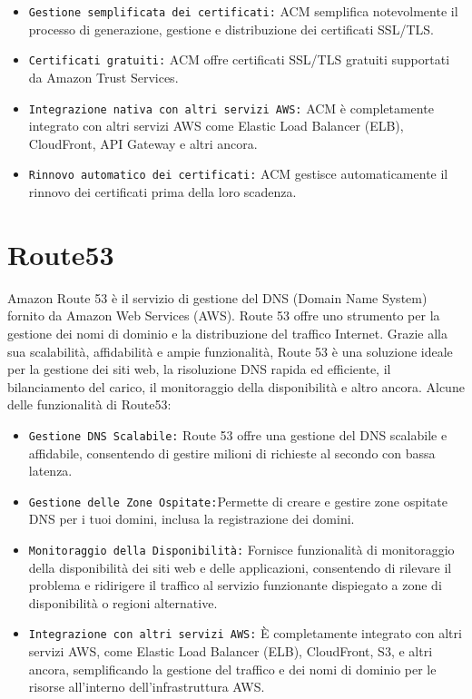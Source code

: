 \begin{itemize}
    \item \texttt{Gestione semplificata dei certificati:} ACM semplifica notevolmente il processo di generazione, gestione e distribuzione dei certificati SSL/TLS.
    \item \texttt{Certificati gratuiti:} ACM offre certificati SSL/TLS gratuiti supportati da Amazon Trust Services.
    \item \texttt{Integrazione nativa con altri servizi AWS:} ACM è completamente integrato con altri servizi AWS come Elastic Load Balancer (ELB), CloudFront, API Gateway e altri ancora.
    \item \texttt{Rinnovo automatico dei certificati:} ACM gestisce automaticamente il rinnovo dei certificati prima della loro scadenza.
\end{itemize}


\section{Route53}

Amazon Route 53 è il servizio di gestione del DNS (Domain Name System) fornito da Amazon Web Services (AWS). Route 53 offre uno strumento per la gestione dei nomi di dominio e la distribuzione del traffico Internet. Grazie alla sua scalabilità, affidabilità e ampie funzionalità, Route 53 è una soluzione ideale per la gestione dei siti web, la risoluzione DNS rapida ed efficiente, il bilanciamento del carico, il monitoraggio della disponibilità e altro ancora. Alcune delle funzionalità di Route53:
\begin{itemize}
    \item \texttt{Gestione DNS Scalabile:} Route 53 offre una gestione del DNS scalabile e affidabile, consentendo di gestire milioni di richieste al secondo con bassa latenza.
    \item \texttt{Gestione delle Zone Ospitate:}Permette di creare e gestire zone ospitate DNS per i tuoi domini, inclusa la registrazione dei domini.
    \item \texttt{Monitoraggio della Disponibilità:} Fornisce funzionalità di monitoraggio della disponibilità dei siti web e delle applicazioni, consentendo di rilevare il problema e ridirigere il traffico al servizio funzionante dispiegato a zone di disponibilità o regioni alternative.
    \item \texttt{Integrazione con altri servizi AWS:} È completamente integrato con altri servizi AWS, come Elastic Load Balancer (ELB), CloudFront, S3, e altri ancora, semplificando la gestione del traffico e dei nomi di dominio per le risorse all’interno dell’infrastruttura AWS.

\end{itemize}



